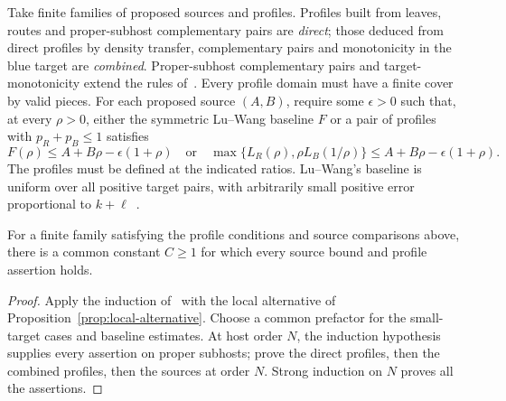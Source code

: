 Take finite families of proposed sources and profiles. Profiles built
from leaves, routes and proper-subhost complementary pairs are
\emph{direct}; those deduced from direct profiles by density transfer,
complementary pairs and monotonicity in the blue target are \emph{combined}.
Proper-subhost complementary pairs and target-monotonicity extend the rules
of~\cite[Definitions~5.4--5.5]{ZBS}.
Every profile domain must have a finite cover by valid pieces.
For each proposed source $(A,B)$, require some $\epsilon>0$ such that,
at every $\rho>0$, either the symmetric Lu--Wang baseline $F$ or a
pair of profiles with $p_R+p_B\le1$ satisfies
\[
 F(\rho)\le A+B\rho-\epsilon(1+\rho)
 \quad\text{or}\quad
 \max\{L_R(\rho),\rho L_B(1/\rho)\}
 \le A+B\rho-\epsilon(1+\rho).
\]
The profiles must be defined at the indicated ratios. Lu--Wang's
baseline is uniform over all positive target pairs, with arbitrarily
small positive error proportional to $k+\ell$~\cite[Lemma~B.1]{LW}.

\begin{proposition}\label{prop:joint-construction}
For a finite family satisfying the profile conditions and source comparisons
above, there is a common constant $C\ge1$ for which every source bound and
profile assertion holds.
\end{proposition}
\begin{proof}
Apply the induction of~\cite[Theorem~5.7]{ZBS} with the local alternative
of Proposition~\ref{prop:local-alternative}.
Choose a common prefactor for the small-target cases
and baseline estimates. At host order $N$, the induction hypothesis
supplies every assertion on proper subhosts; prove the direct profiles,
then the combined profiles, then the sources at order $N$.
Strong induction on $N$ proves all the assertions.
\end{proof}
